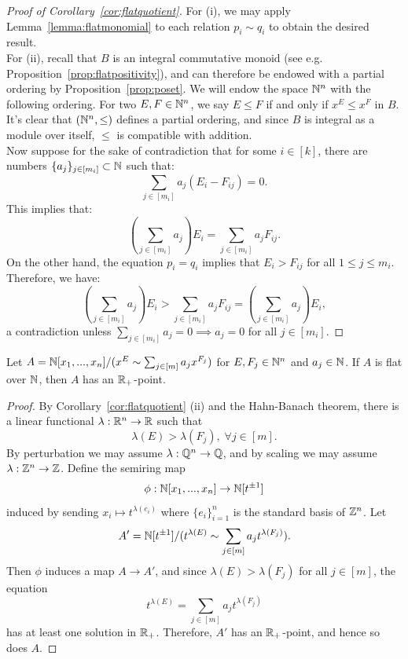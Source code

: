 \begin{proof}[Proof of Corollary~\ref{cor:flatquotient}]
For (i), we may apply Lemma~\ref{lemma:flatmonomial} to each relation $p_i \sim q_i$ to obtain the desired result.\\
\indent For (ii), recall that $B$ is an integral commutative monoid (see e.g. Proposition~\ref{prop:flatpositivity}), and 
can therefore be endowed with a partial ordering by Proposition~\ref{prop:poset}. We will endow the space $\mathbb{N}^n$ with the following ordering. 
For two $E,F \in \mathbb{N}^n$, we say $E \le F$ if and only if $x^E \le x^F$ in $B$. It's clear that $(\mathbb{N}^n, \le)$ defines
a partial ordering, and since $B$ is integral as a module over itself, $\le$ is compatible with addition.\\
\indent Now suppose for the sake of contradiction that for some $i \in [k]$, there are numbers $\{a_j\}_{j \in [m_i]} \subset \mathbb{N}$ such that:
\[\sum_{j\in [m_i]} a_j (E_i-F_{ij}) = 0.\]
This implies that:
\[\left(\sum_{j\in [m_i]} a_j\right) E_i = \sum_{j\in [m_i]} a_j F_{ij}.\]
On the other hand, the equation $p_i=q_i$ implies that $E_i > F_{ij}$ for all $1 \le j \le m_i$. Therefore, we have:
\[\left(\sum_{j\in [m_i]} a_j\right) E_i > \sum_{j\in [m_i]} a_j F_{ij} = \left(\sum_{j\in [m_i]} a_j\right) E_i,\]
a contradiction unless $\sum_{j\in [m_i]} a_j=0 \implies a_j=0$ for all $j \in [m_i]$.
\end{proof}
\begin{corollary}
Let $A=\mathbb{N}[x_1,...,x_n]/(x^{E}\sim \sum_{j \in [m]} a_j x^{F_j})$ for $E,F_j \in \mathbb{N}^n$ and $a_j \in \mathbb{N}$. 
If $A$ is flat over $\mathbb{N}$, then
$A$ has an $\mathbb{R}_{+}$-point.
\end{corollary}
\begin{proof}
By Corollary~\ref{cor:flatquotient} (ii) and the Hahn-Banach theorem, there is a linear functional $\lambda: \mathbb{R}^n \rightarrow \mathbb{R}$ such that
\[\lambda(E) > \lambda(F_j), \; \forall j \in [m].\]
By perturbation we may assume $\lambda: \mathbb{Q}^n \rightarrow \mathbb{Q}$, and by scaling we may assume $\lambda: \mathbb{Z}^n \rightarrow \mathbb{Z}$. Define the semiring map
\[\phi: \mathbb{N}[x_1,...,x_n] \rightarrow \mathbb{N}[t^{\pm 1}]\]
induced by sending $x_i \mapsto t^{\lambda(e_i)}$ where $\{e_i\}_{i=1}^n$ is the standard basis of $\mathbb{Z}^n$. Let
\[A'=\mathbb{N}[t^{\pm1}]/(t^{\lambda(E)} \sim \sum_{j \in [m]} a_j t^{\lambda(F_j)}).\]
Then $\phi$ induces a map $A \to A'$, and since $\lambda(E) > \lambda(F_j)$ for all $j \in [m]$, the equation
\[t^{\lambda(E)} = \sum_{j \in [m]} a_j t^{\lambda(F_j)}\]
has at least one solution in $\mathbb{R}_{+}$. Therefore, $A'$ has an $\mathbb{R}_{+}$-point, and hence so does $A$.
\end{proof}
